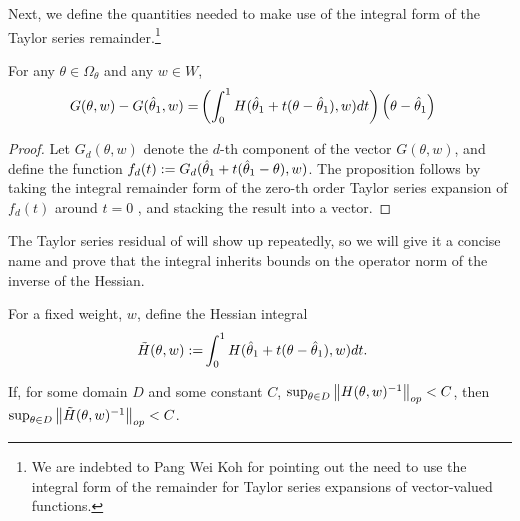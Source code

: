 Next, we define the quantities needed to make use of the integral form of
the Taylor series remainder.\footnote{We are indebted to Pang Wei Koh for
pointing out the need to use the integral form of the remainder for
Taylor series expansions of vector-valued functions.}

\begin{prop}
\label{propref:taylor_series_remainder}
%
For any $\theta \in \Omega_{\theta}$ and any $w \in W$,
%
\begin{align*}
G(\theta, w) - G(\hat{\theta}_{1}, w) =&
    \left(\int_0^1 H(\hat{\theta}_{1} + t (\theta - \hat{\theta}_{1}), w) dt\right)
    \left(\theta - \hat{\theta}_{1}\right)
\end{align*}
%
\end{prop}
%
\begin{proof}
%
Let $G_d(\theta, w)$ denote the $d$-th component of the vector $G(\theta, w)$,
and define the function $f_d(t) := G_d(\hat{\theta}_{1} + t (\hat{\theta}_{1} - \theta), w)$.
The proposition follows by taking the integral remainder form of the zero-th
order Taylor series expansion of $f_d(t)$ around $t=0$  \citep[Appendix
B.2]{dudley:2018:analysis}, and stacking the result into a vector.
%
\end{proof}


The Taylor series residual of  will show up
repeatedly, so we will give it a concise name and prove that the integral
inherits bounds on the operator norm of the inverse of the Hessian.


\begin{defn}
\label{defref:hess_integral}
%
For a fixed weight, $w$, define the Hessian integral
%
\begin{align*}
\tilde{H}(\theta, w) :=&
    \int_0^1 H(\hat{\theta}_{1} + t (\theta - \hat{\theta}_{1}), w) dt.
\end{align*}
\end{defn}




\begin{lem}\label{lem:hess_integral_invertible}
%
If, for some domain $D$ and some constant $C$, $\sup_{\theta \in D}
\left\Vert H(\theta, w)^{-1}\right\Vert_{op} < C$, then
$\sup_{\theta \in D} \left\Vert \tilde{H}(\theta, w)^{-1}\right\Vert_{op} < C$.
%
\end{lem}

